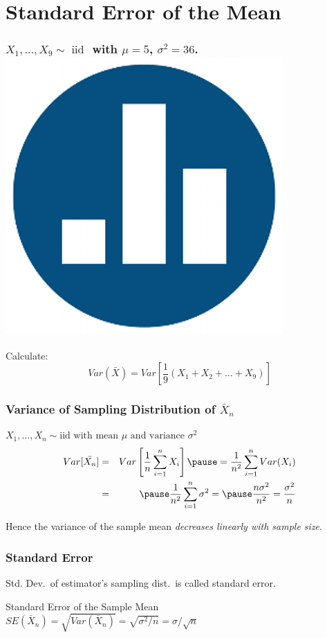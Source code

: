 \section{Standard Error of the Mean}
\begin{frame}
\frametitle{$X_1,\hdots, X_{9} \sim \mbox{ iid }$ with $\mu=5$, $\sigma^2 = 36$. \hfill\includegraphics[scale = 0.05]{./images/clicker}}

\large Calculate:
	 $$Var(\bar{X}) = Var\left[\frac{1}{9}(X_1 + X_2 + \hdots + X_{9})\right]$$
\end{frame}

\begin{frame}
\frametitle{Variance of Sampling Distribution of $\bar{X}_n$}
\alert{$X_1, \hdots, X_n \sim \mbox{iid with mean }\mu \mbox{ and variance } \sigma^2$}
\begin{eqnarray*}
Var[\bar{X_n}] &=& Var\left[ \frac{1}{n}\sum_{i=1}^n X_i \right] \pause= \frac{1}{n^2} \sum_{i=1}^n Var(X_i) \\
&=& \pause \frac{1}{n^2} \sum_{i=1}^n \sigma^2 = \pause \frac{n\sigma^2}{n^2} =  \frac{\sigma^2}{n}
\end{eqnarray*}

\alert{Hence the variance of the sample mean \emph{decreases linearly with sample size}.}
\end{frame}
\begin{frame}
\frametitle{Standard Error}
Std. Dev.\ of estimator's sampling dist.\ is called \alert{standard error}.
\begin{block}{Standard Error of the Sample Mean}
$SE(\bar{X}_n)= \sqrt{Var\left(\bar{X}_n\right)}= \sqrt{\sigma^2/n}=\sigma/\sqrt{n}$
\end{block}
\end{frame}

